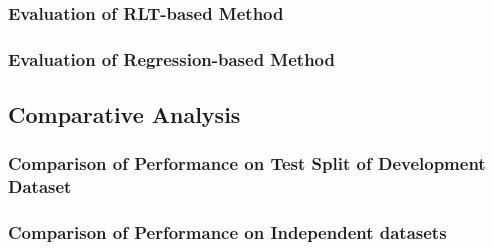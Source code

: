\subsubsection{Evaluation of RLT-based Method}
\label{subsubsec:eval_rlt_indep}


\subsubsection{Evaluation of Regression-based Method}
\label{subsubsec:eval_regression_indep}



\subsection{Comparative Analysis}
\label{subsec:compar_anal}

\subsubsection{Comparison of Performance on Test Split of Development Dataset}
\label{subsubsec:perf_comp_dev}


\subsubsection{Comparison of Performance on Independent datasets}
\label{subsubsec:perf_comp_indep}


